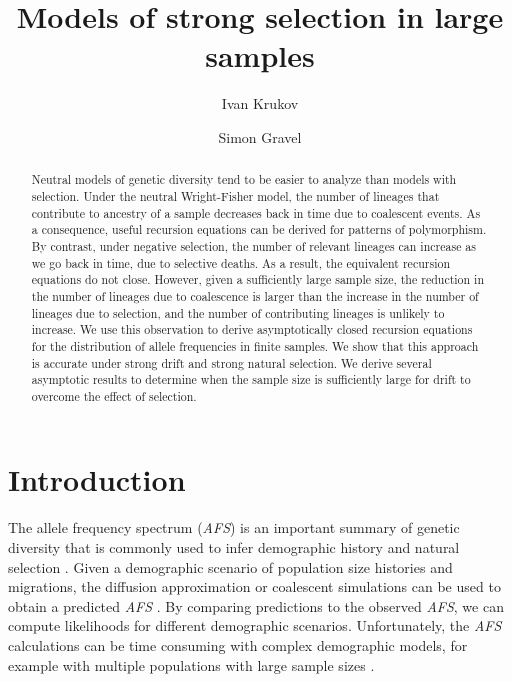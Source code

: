 \documentclass[review]{elsarticle}
\begin{document}
\begin{frontmatter}
  \title{Models of strong selection in large samples}

  \author{Ivan Krukov}
  \author{Simon Gravel}

  \begin{abstract}
    
    Neutral models of genetic diversity tend to be easier to analyze than models with selection.
    Under the neutral Wright-Fisher model, the number of lineages that contribute to ancestry of a
    sample decreases back in time due to coalescent events. As a consequence, useful recursion
    equations can be derived for patterns of polymorphism. By contrast, under negative selection,
    the number of relevant lineages can increase as we go back in time, due to selective deaths. As
    a result, the equivalent recursion equations do not close. However, given a sufficiently large
    sample size, the reduction in the number of lineages due to coalescence is larger than the
    increase in the number of lineages due to selection, and the number of contributing lineages is
    unlikely to increase. We use this observation to derive asymptotically closed recursion
    equations for the distribution of allele frequencies in finite samples. We show that this
    approach is accurate under strong drift and strong natural selection. We derive several
    asymptotic results to determine when the sample size is sufficiently large for drift to
    overcome the effect of selection.
  \end{abstract}

\end{frontmatter}

\section{Introduction}
\label{sec:introduciton}

The allele frequency spectrum (\textit{AFS}) is an important summary of genetic diversity that is
commonly used to infer demographic history and natural selection \citep{}. Given a demographic
scenario of population size histories and migrations, the diffusion approximation or coalescent
simulations can be used to obtain a predicted \textit{AFS} \citep{}. By comparing
predictions to the observed \textit{AFS}, we can compute likelihoods for different demographic
scenarios. Unfortunately, the \textit{AFS} calculations can be time consuming with complex
demographic models, for example with multiple populations with large sample sizes \citep{}.
\end{document}
